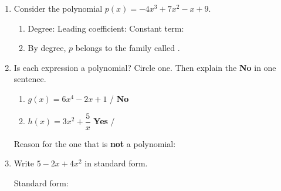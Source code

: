 \documentclass[10pt]{article}
\begin{document}

\vspace{0.12in}

\begin{enumerate}[itemsep=12pt]

\item Consider the polynomial $p(x) = -4x^3 + 7x^2 - x + 9$.

\vspace{0.06in}
\begin{enumerate}[label=(\alph*), itemsep=6pt]
  \item Degree:  \qquad Leading coefficient: 
        \qquad Constant term: 
  \item By degree, $p$ belongs to the family called .
\end{enumerate}

\item Is each expression a polynomial? Circle one. Then explain the \textbf{No} in
      one sentence.

\begin{enumerate}[label=(\alph*), itemsep=6pt]
  \item $g(x) = 6x^4 - 2x + 1$ \quad {} / \textbf{No}
  \item $h(x) = 3x^2 + \dfrac{5}{x}$ \quad \textbf{Yes} / 
\end{enumerate}

\vspace{0.06in}
Reason for the one that is \textbf{not} a polynomial:

\vspace{0.06in}

\item Write $5 - 2x + 4x^2$ in standard form.

\vspace{0.1in}
Standard form: 

\end{enumerate}
\end{document}
